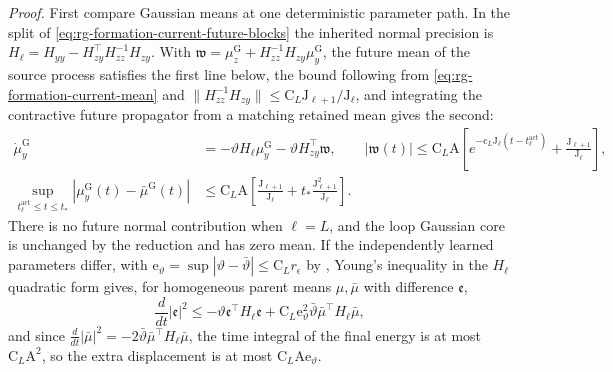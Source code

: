 \noindent\emph{Proof.}
First compare Gaussian means at one deterministic parameter path. In the split
of \cref{eq:rg-formation-current-future-blocks} the inherited normal precision
is \(H_\ell=H_{yy}-H_{zy}^\top H_{zz}^{-1}H_{zy}\). With
\(\mathfrak w=\mu_z^{\mathrm G}+H_{zz}^{-1}H_{zy}\mu_y^{\mathrm G}\), the future
mean of the source process satisfies the first line below, the bound following
from \cref{eq:rg-formation-current-mean} and
\(\|H_{zz}^{-1}H_{zy}\|\le\mathrm C_L\mathrm J_{\ell+1}/\mathrm J_\ell\), and
integrating the contractive future propagator from a matching retained mean
gives the second:
\begin{align}
 \dot\mu_y^{\mathrm G}&=-\vartheta H_\ell\mu_y^{\mathrm G}-\vartheta H_{zy}^\top\mathfrak w,
 \qquad
 |\mathfrak w(t)|\le \mathrm C_L\mathrm A\left[
 e^{-\mathrm c_L\mathrm J_\ell(t-t^{\mathrm{act}}_\ell)}+\frac{\mathrm J_{\ell+1}}{\mathrm J_\ell}\right],
 \label{eq:rg-formation-gaussian-mean-defect}\\
 \sup_{t^{\mathrm{act}}_\ell\le t\le t_*}
 |\mu_y^{\mathrm G}(t)-\bar\mu^{\mathrm G}(t)|
 &\le \mathrm C_L\mathrm A\left[
 \frac{\mathrm J_{\ell+1}}{\mathrm J_\ell}
 +t_*\frac{\mathrm J_{\ell+1}^2}{\mathrm J_\ell}\right].
 \label{eq:rg-formation-gaussian-mean-reduction}
\end{align}
There is no future normal contribution when \(\ell=L\), and the loop Gaussian
core is unchanged by the reduction and has zero mean. If the independently
learned parameters differ, with
\(\mathrm e_\vartheta=\sup|\vartheta-\bar\vartheta|\le\mathrm C_Lr_\epsilon\) by
, Young's inequality in the \(H_\ell\)
quadratic form gives, for homogeneous parent means \(\mu,\bar\mu\) with
difference \(\mathfrak e\),
\begin{equation}
 \frac d{dt}|\mathfrak e|^2
 \le-\vartheta \mathfrak e^\top H_\ell\mathfrak e
       +\mathrm C_L\mathrm e_\vartheta^2 \bar\vartheta
                         \bar\mu^\top H_\ell\bar\mu,
 \label{eq:rg-formation-mean-parameter-energy}
\end{equation}
and since \(\frac d{dt}|\bar\mu|^2=-2\bar\vartheta\bar\mu^\top H_\ell\bar\mu\),
the time integral of the final energy is at most \(\mathrm C_L\mathrm A^2\), so
the extra displacement is at most \(\mathrm C_L\mathrm A \mathrm e_\vartheta\).

